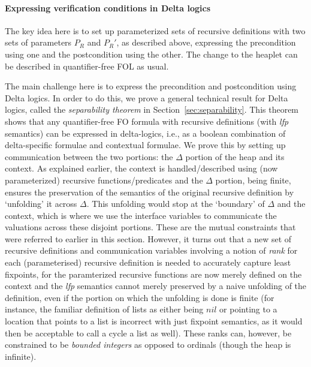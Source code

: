 \documentclass[acmsmall,review,anonymous]{acmart}\settopmatter{printfolios=true,printccs=false,printacmref=false}
\begin{document}
\paragraph{Expressing verification conditions in Delta logics}
The key idea here is to set up parameterized sets of recursive definitions with two sets of parameters $P_R$ and $P_R'$, as described above, expressing the precondition using
one and the postcondition using the other. The change to the heaplet can be described in quantifier-free FOL as usual.

The main challenge here is to express the precondition and postcondition using Delta logics.
In order to do this, we prove a general technical result for Delta logics, called the \emph{separability theorem} in Section~\ref{sec:separability}. This theorem shows that any quantifier-free FO formula
with recursive definitions (with \textit{lfp} semantics) can be expressed in delta-logics, i.e., as a boolean combination of delta-specific formulae
and contextual formulae. We prove this by setting up communication between the two portions: the $\Delta$ portion of the heap 
and its context. As explained earlier, the context is handled/described using (now parameterized) recursive functions/predicates and the $\Delta{}$ portion, being finite, ensures the preservation of the semantics of the original recursive definition by `unfolding' it across $\Delta{}$. This unfolding would stop at the `boundary' of $\Delta{}$ and the context, which is where we use the interface variables to communicate the valuations across these disjoint portions. These are the mutual constraints that were referred to earlier in this section.
However, it turns out that a new set of recursive definitions and communication variables involving a notion of \emph{rank} for each (parameterised) recursive definition is
needed to accurately capture least fixpoints, for the paramterized recursive functions are now merely defined on the context and the \textit{lfp} semantics cannot merely preserved by a naive unfolding of the definition, even if the portion on which the unfolding is done is finite (for instance, the familiar definition of lists as either being $nil$ or pointing to a location that points to a list is incorrect with just fixpoint semantics, as it would then be acceptable to call a cycle a list as well). These ranks can, however, be constrained to be \emph{bounded integers} as opposed to ordinals (though the heap is infinite). 
\end{document}
